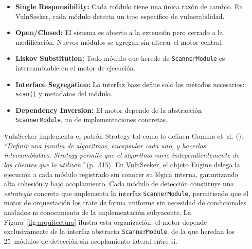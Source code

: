 \documentclass[12pt, a4paper]{article}
\begin{document}
\begin{itemize}
    \item \textbf{Single Responsibility:} Cada módulo tiene una única razón de
    cambio. En VulnSeeker, cada módulo detecta un tipo específico de
    vulnerabilidad.

    \item \textbf{Open/Closed:} El sistema es abierto a la extensión pero
    cerrado a la modificación. Nuevos módulos se agregan sin alterar el motor
    central.

    \item \textbf{Liskov Substitution:} Todo módulo que herede de
    \texttt{ScannerModule} es intercambiable en el motor de ejecución.

    \item \textbf{Interface Segregation:} La interfaz base define solo los métodos
    necesarios: \texttt{scan()} y metadatos del módulo.

    \item \textbf{Dependency Inversion:} El motor depende de la abstracción
    \texttt{ScannerModule}, no de implementaciones concretas.
\end{itemize}

VulnSeeker implementa el patrón Strategy tal como lo definen Gamma et~al.
(\citeyear*{gamma1995}): \textit{``Definir una familia de algoritmos,
encapsular cada uno, y hacerlos intercambiables. Strategy permite que el
algoritmo varíe independientemente de los clientes que lo utilizan''}
(p.~315). En VulnSeeker, el objeto Engine delega la ejecución a cada módulo
registrado sin conocer su lógica interna, garantizando alta cohesión y bajo
acoplamiento. Cada módulo de detección constituye una \textit{estrategia}
concreta que implementa la interfaz \texttt{ScannerModule}, permitiendo que
el motor de orquestación los trate de forma uniforme sin necesidad de
condicionales anidados ni conocimiento de la implementación subyacente. La
Figura~\ref{fig:arquitectura} ilustra esta organización: el motor depende
exclusivamente de la interfaz abstracta \texttt{ScannerModule}, de la que heredan
los 25~módulos de detección sin acoplamiento lateral entre sí.
\end{document}
